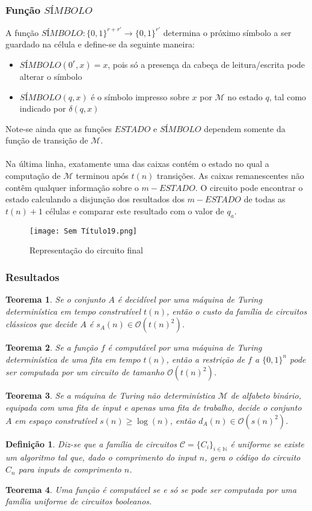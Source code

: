 \documentclass[10pt,a4paper]{report}
\newtheorem{definition}{Definição}
\newtheorem{theorem}{Teorema}
\begin{document}
\subsubsection{Função $SÍMBOLO$}
A função $SÍMBOLO: \{0,1\}^{r+r'} \rightarrow \{0,1\}^{r'}$ determina o próximo símbolo a ser guardado na célula e define-se da seguinte maneira:
\begin{itemize}
\item $SÍMBOLO(0^r,x) = x$, pois só a presença da cabeça de leitura/escrita pode alterar o símbolo
\item $SÍMBOLO(q, x)$ é o símbolo impresso sobre $x$ por $\mathcal{M}$ no estado $q$, tal como indicado por $\delta(q, x)$
\end{itemize}
Note-se ainda que as funções $ESTADO$ e $SÍMBOLO$ dependem somente da função de transição de $\mathcal{M}$.\\
\\
Na última linha, exatamente uma das caixas contém o estado no qual a computação de $\mathcal{M}$ terminou após $t(n)$ transições. As caixas remanescentes não contêm qualquer informação sobre o $m-ESTADO$. O circuito pode encontrar o estado calculando a disjunção dos resultados dos $m-ESTADO$ de todas as $t(n)+1$ células e comparar este resultado com o valor de $q_a$.
\begin{figure}[H]
\centering
\texttt{[image: Sem Título19.png]}
\caption{Representação do circuito final}
\end{figure}
\subsubsection{Resultados}
\begin{theorem}
Se o conjunto $A$ é decidível por uma máquina de Turing determinística em tempo construtível $t(n)$, então o custo da família de circuitos clássicos que decide $A$ é $s_A(n) \in \mathcal{O}(t(n)^2)$.
\end{theorem}
\begin{theorem}
Se a função $f$ é computável por uma máquina de Turing determinística de uma fita em tempo $t(n)$, então a restrição de $f$ a $\{0,1\}^n$ pode ser computada por um circuito de tamanho $\mathcal{O}(t(n)^2)$.
\end{theorem}
\begin{theorem}
Se a máquina de Turing não determinística $\mathcal{M}$ de alfabeto binário, equipada com uma fita de input e apenas uma fita de trabalho, decide o conjunto $A$ em espaço construtível $s(n) \geq \log (n)$, então $d_A(n) \in \mathcal{O}(s(n)^2)$.
\end{theorem}
\begin{definition}
Diz-se que a família de circuitos $\mathcal{C} = \{C_i\}_{i\in \mathbb{N}}$ é uniforme se existe um algoritmo tal que, dado o comprimento do input $n$, gera o código do circuito $C_n$ para inputs de comprimento $n$.
\end{definition}
\begin{theorem}
Uma função é computável se e só se pode ser computada por uma família uniforme de circuitos booleanos.
\end{theorem}
\end{document}
